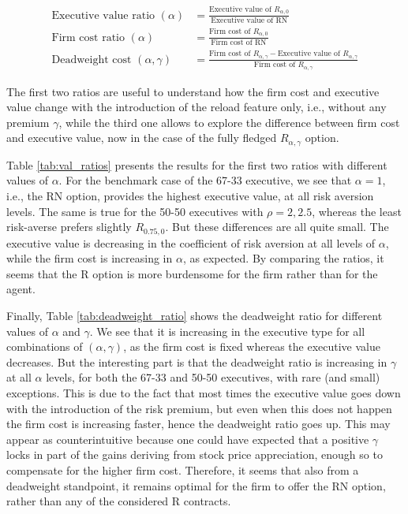 \vspace{-2em}
\begin{align*}
    \text{Executive value ratio } (\alpha) &= \frac{\text{Executive value of } R_{\alpha,0}}{\text{Executive value of RN}} \\[1em]
    \text{Firm cost ratio } (\alpha) & = \frac{\text{Firm cost of } R_{\alpha,0}}{\text{Firm cost of RN}} \\[1em]
    \text{Deadweight cost } (\alpha, \gamma) &= \frac{\text{Firm cost of } R_{\alpha,\gamma} - \text{Executive value of } R_{\alpha,\gamma}}{\text{Firm cost of }R_{\alpha,\gamma}}
\end{align*}
\vspace{-2em}

The first two ratios are useful to understand how the firm cost and executive value change with the introduction of the reload feature only, i.e., without any premium $\gamma$, while the third one allows to explore the difference between firm cost and executive value, now in the case of the fully fledged $R_{\alpha,\gamma}$ option. %

Table \ref*{tab:val_ratios} presents the results for the first two ratios with different values of $\alpha$. For the benchmark case of the 67-33 executive, we see that $\alpha = 1$, i.e., the RN option, provides the highest executive value, at all risk aversion levels. The same is true for the 50-50 executives with $\rho = 2, 2.5$, whereas the least risk-averse prefers slightly $R_{0.75,0}$. But these differences are all quite small. The executive value is decreasing in the coefficient of risk aversion at all levels of $\alpha$, while the firm cost is increasing in $\alpha$, as expected. By comparing the ratios, it seems that the R option is more burdensome for the firm rather than for the agent.  


Finally, Table \ref*{tab:deadweight_ratio} shows the deadweight ratio for different values of $\alpha$ and $\gamma$. We see that it is increasing in the executive type for all combinations of $(\alpha, \gamma)$, as the firm cost is fixed whereas the executive value decreases. But the interesting part is that the deadweight ratio is increasing in $\gamma$ at all $\alpha$ levels, for both the 67-33 and 50-50 executives, with rare (and small) exceptions. This is due to the fact that most times the executive value goes down with the introduction of the risk premium, but even when this does not happen the firm cost is increasing faster, hence the deadweight ratio goes up. This may appear as counterintuitive because one could have expected that a positive $\gamma$ locks in part of the gains deriving from stock price appreciation, enough so to compensate for the higher firm cost. 
Therefore, it seems that also from a deadweight standpoint, it remains optimal for the firm to offer the RN option, rather than any of the considered R contracts. 

